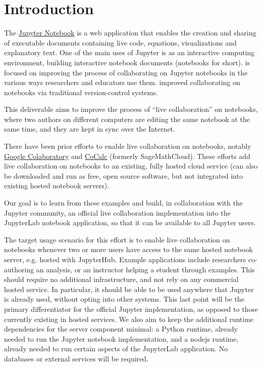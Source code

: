 \documentclass{deliverablereport}
\author{Benjamin Ragan-Kelley, Vidar Tonaas Fauske}
\begin{document}
\maketitle
\tableofcontents


\section{Introduction}

The \href{https://jupyter.org}{Jupyter Notebook} is a web application
that enables the creation and sharing of executable documents
containing live code, equations, visualizations and explanatory text.
One of the main uses of Jupyter is as an interactive computing environment,
building interactive notebook documents (notebooks for short).
 is focused on improving the process of collaborating
on Jupyter notebooks in the various ways researchers and educators use them.
 improved collaborating on notebooks via traditional version-control systems.

This deliverable aims to improve the process of ``live collaboration'' on notebooks,
where two authors on different computers are editing the same notebook at the same time,
and they are kept in sync over the Internet.

There have been prior efforts to enable live collaboration on notebooks,
notably \href{https://colaboratory.google.com}{Google Colaboratory}
and \href{https://cocalc.com}{CoCalc} (formerly SageMathCloud).
These efforts add live collaboration on notebooks to an existing,
fully hosted cloud service (\cocalc can also be downloaded and run as
free, open source software, but not integrated into existing
hosted notebook servers).

Our goal is to learn from these examples and build,
in collaboration with the Jupyter community,
an official live collaboration implementation into the JupyterLab notebook application,
so that it can be available to all Jupyter users.

The target usage scenario for this effort is to enable live
collaboration on notebooks whenever two or more users have access to the same hosted notebook server, e.g. hosted with JupyterHub.
Example applications include researchers co-authoring an analysis,
or an instructor helping a student through examples.
This should require no additional infrastructure,
and not rely on any commercial hosted service.
In particular, it should be able to be used anywhere that Jupyter is already used,
without opting into other systems.
This last point will be the primary differentiator for the official Jupyter implementation,
as opposed to those currently existing in hosted services.
We also aim to keep the additional runtime dependencies for the server component minimal:
a Python runtime, already needed to run the Jupyter notebook implementation,
and a nodejs runtime, already needed to run certain aspects of the JupyterLab application.
No databases or external services will be required.
\end{document}
